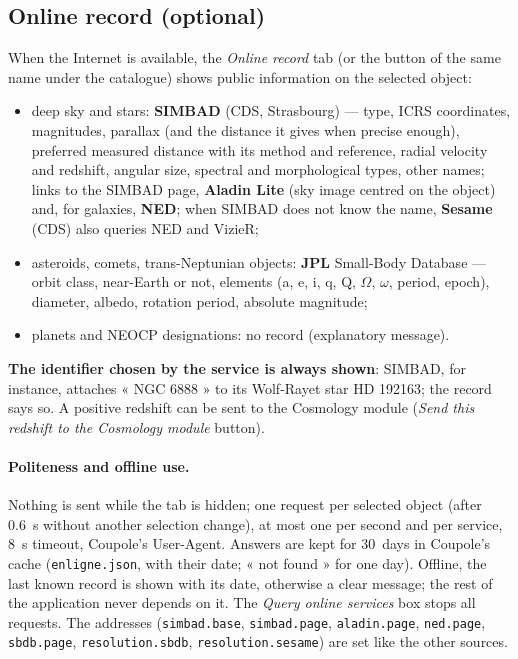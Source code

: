 \subsection{Online record (optional)}\label{sec:fiche}
When the Internet is available, the \emph{Online record} tab (or the button of the same name under the catalogue)
shows public information on the selected object:
\begin{itemize}
\item deep sky and stars: \textbf{SIMBAD} (CDS, Strasbourg) --- type, ICRS coordinates, magnitudes, parallax (and
the distance it gives when precise enough), preferred measured distance with its method and reference, radial
velocity and redshift, angular size, spectral and morphological types, other names; links to the SIMBAD page,
\textbf{Aladin Lite} (sky image centred on the object) and, for galaxies, \textbf{NED}; when SIMBAD does not know
the name, \textbf{Sesame} (CDS) also queries NED and VizieR;
\item asteroids, comets, trans-Neptunian objects: \textbf{JPL} Small-Body Database --- orbit class, near-Earth or
not, elements (a, e, i, q, Q, $\Omega$, $\omega$, period, epoch), diameter, albedo, rotation period, absolute
magnitude;
\item planets and NEOCP designations: no record (explanatory message).
\end{itemize}
\textbf{The identifier chosen by the service is always shown}: SIMBAD, for instance, attaches « NGC 6888 » to its
Wolf-Rayet star HD 192163; the record says so. A positive redshift can be sent to the Cosmology module
(\emph{Send this redshift to the Cosmology module} button).

\paragraph{Politeness and offline use.} Nothing is sent while the tab is hidden; one request per selected object
(after 0.6~s without another selection change), at most one per second and per service, 8~s timeout, Coupole's
User-Agent. Answers are kept for 30~days in Coupole's cache (\texttt{enligne.json}, with their date; « not found »
for one day). Offline, the last known record is shown with its date, otherwise a clear message; the rest of the
application never depends on it. The \emph{Query online services} box stops all requests. The addresses
(\texttt{simbad.base}, \texttt{simbad.page}, \texttt{aladin.page}, \texttt{ned.page}, \texttt{sbdb.page},
\texttt{resolution.sbdb}, \texttt{resolution.sesame}) are set like the other sources.

